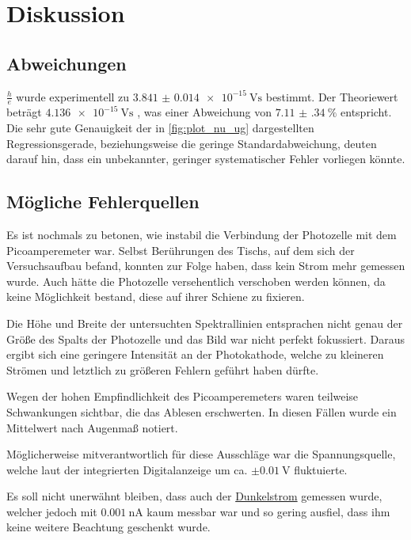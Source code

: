 \section{Diskussion} \label{sec:diskussion}

\subsection{Abweichungen}

$\frac{h}{e}$ wurde experimentell zu $\SI{3.841(14)e-15}{\volt\second}$ bestimmt.
Der Theoriewert beträgt $\SI{4.136e-15}{\volt\second}$ \cite{e}\cite{h},
was einer Abweichung von $\SI{7.11(34)}{\percent}$ entspricht.
Die sehr gute Genauigkeit der in \autoref{fig:plot_nu_ug} dargestellten Regressionsgerade,
beziehungsweise die geringe Standardabweichung,
deuten darauf hin, dass ein unbekannter, geringer systematischer Fehler vorliegen könnte.

\subsection{Mögliche Fehlerquellen}

Es ist nochmals zu betonen,
wie instabil die Verbindung der Photozelle mit dem Picoamperemeter war.
Selbst Berührungen des Tischs, auf dem sich der Versuchsaufbau befand,
konnten zur Folge haben, dass kein Strom mehr gemessen wurde.
Auch hätte die Photozelle versehentlich verschoben werden können,
da keine Möglichkeit bestand, diese auf ihrer Schiene zu fixieren.

Die Höhe und Breite der untersuchten Spektrallinien entsprachen nicht genau
der Größe des Spalts der Photozelle
und das Bild war nicht perfekt fokussiert.
Daraus ergibt sich eine geringere Intensität an der Photokathode,
welche zu kleineren Strömen und letztlich zu größeren Fehlern geführt haben dürfte.

Wegen der hohen Empfindlichkeit des Picoamperemeters waren teilweise Schwankungen sichtbar,
die das Ablesen erschwerten.
In diesen Fällen wurde ein Mittelwert nach Augenmaß notiert.

Möglicherweise mitverantwortlich für diese Ausschläge war die Spannungsquelle,
welche laut der integrierten Digitalanzeige um ca. $\pm\SI{0.01}{\volt}$ fluktuierte.

Es soll nicht unerwähnt bleiben,
dass auch der \hyperref[sec:durchfuehrung:dunkelstrom]{Dunkelstrom} gemessen wurde,
welcher jedoch mit $\SI{0.001}{\nano\ampere}$ kaum messbar war
und so gering ausfiel,
dass ihm keine weitere Beachtung geschenkt wurde.
